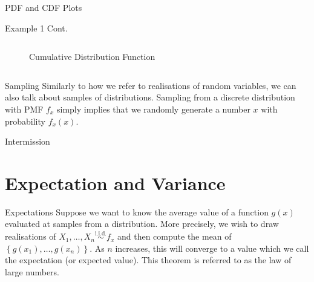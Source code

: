 \documentclass[10pt]{beamer}
\begin{document}
\begin{frame}[fragile]{PDF and CDF Plots}
\begin{exampleblock}{Example 1 Cont.}
\begin{columns}
\begin{column}{0.425\textwidth}
\begin{figure}
    \caption{Cumulative Distribution Function}
\end{figure}
\end{column}
\end{columns}
\end{exampleblock}
\end{frame}

\begin{frame}[fragile]{Sampling}
Similarly to how we refer to realisations of random variables, we can also talk about samples of distributions. Sampling from a discrete distribution with PMF \(f_x\) simply implies that we randomly generate a number \(x\) with probability \(f_x\left(x\right)\).


\end{frame}

\begin{frame}[standout]
Intermission
\end{frame}

\section{Expectation and Variance}

\begin{frame}[fragile]{Expectations}
Suppose we want to know the average value of a function \(g\left(x\right)\) evaluated at samples from a distribution. More precisely, we wish to draw realisations of \(X_1, \dots, X_n \overset{\textrm{i.i.d.}}{\sim} f_x\) and then compute the mean of \(\left\{g\left(x_1\right), \dots, g\left(x_n\right)\right\}\). As \(n\) increases, this will converge to a value which we call the expectation (or expected value). This theorem is referred to as the law of large numbers.

\end{frame}
\end{document}
